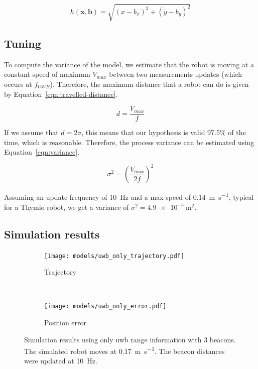 \documentclass[a4paper, 12pt]{scrreprt}
\begin{document}
\begin{equation}
h(\mathbf{x}, \mathbf{b}) = \sqrt{\left(x - b_x\right)^2 + \left(y - b_y\right)^2}
\label{eqn:uwb-only-measurement}
\end{equation}

\subsection{Tuning}

To compute the variance of the model, we estimate that the robot is moving at a constant speed of maximum $V_{max}$ between two measurements updates (which occurs at \(f_{UWB}\)).
Therefore, the maximum distance that a robot can do is given by Equation~\ref{eqn:travelled-distance}.

\begin{equation}
d = \frac{V_{max}}{f}
\label{eqn:travelled-distance}
\end{equation}

If we assume that \(d = 2 \sigma\), this means that our hypothesis is valid 97.5\% of the time, which is reasonable.
Therefore, the process variance can be estimated using Equation~\ref{eqn:variance}.

\begin{equation}
\sigma^2 = \left( \frac{V_{max}}{2 f} \right)^2
\label{eqn:variance}
\end{equation}

Assuming an update frequency of \SI{10}{\hertz} and a max speed of \SI{0.14}{\meter\per\second}, typical for a Thymio robot\cite{thymioweb}, we get a variance of $\sigma^2 = \SI{4.9e-5}{\meter\squared}$.


\subsection{Simulation results}

\begin{figure}[htpb]
    \centering
    \begin{subfigure}[t]{0.4\textwidth}
        \texttt{[image: models/uwb\_only\_trajectory.pdf]}
        \caption{Trajectory}
    \end{subfigure}%
    ~
    \begin{subfigure}[t]{0.4\textwidth}
        \texttt{[image: models/uwb\_only\_error.pdf]}
        \caption{Position error}
    \end{subfigure}
    \caption{
        Simulation results using only \gls{uwb} range information with 3 beacons.
        The simulated robot moves at \SI{0.17}{\meter\per\second}.
        The beacon distances were updated at \SI{10}{\hertz}.
        \label{fig:uwb_only}
    }
\end{figure}
\end{document}
